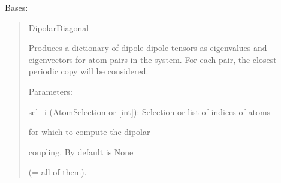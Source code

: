 \documentclass[letterpaper,10pt,english]{sphinxmanual}
\begin{document}
\begin{fulllineitems}

\begin{fulllineitems}
\label{doctree/soprano.properties.nmr.dipolar:soprano.properties.nmr.dipolar.DipolarCoupling.extract}
\end{fulllineitems}


\end{fulllineitems}


\begin{fulllineitems}
\label{doctree/soprano.properties.nmr.dipolar:soprano.properties.nmr.dipolar.DipolarDiagonal}
Bases: {\hyperref[doctree/soprano.properties.atomsproperty:soprano.properties.atomsproperty.AtomsProperty]{}}
\begin{quote}

DipolarDiagonal

Produces a dictionary of dipole-dipole tensors as eigenvalues and
eigenvectors for atom pairs in the system. For each pair, the closest
periodic copy will be considered.

\begin{DUlineblock}{0em}
\item[] Parameters:
\item[]
\begin{DUlineblock}{\DUlineblockindent}
\item[] sel\_i (AtomSelection or {[}int{]}): Selection or list of indices of atoms
\item[]
\begin{DUlineblock}{\DUlineblockindent}
\item[] for which to compute the dipolar
\item[] coupling. By default is None
\item[] (= all of them).
\end{DUlineblock}
\end{DUlineblock}
\end{DUlineblock}
\end{quote}


\end{fulllineitems}
\end{document}
